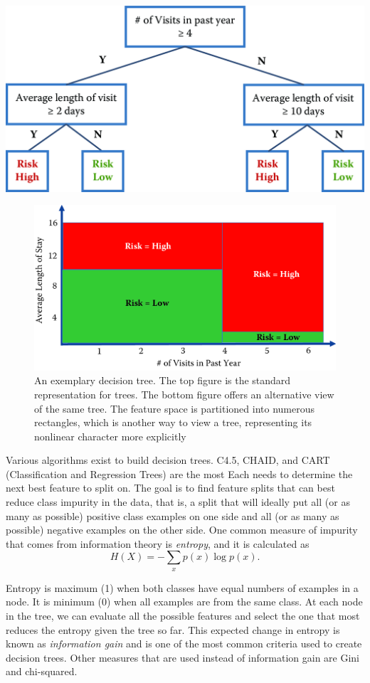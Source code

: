 \documentclass[]{krantz}
\begin{document}
\begin{center}\includegraphics[width=0.7\linewidth]{ChapterML/figures/tree} \end{center}\begin{figure}

{\centering \includegraphics[width=0.7\linewidth]{ChapterML/figures/tree-rectangle} 

}

\caption{An exemplary decision tree. The top figure is the standard representation for trees. The bottom figure offers an alternative view of the same tree. The feature space is partitioned into numerous rectangles, which is another way to view a tree, representing its nonlinear character more explicitly}\label{fig:tree}
\end{figure}

Various algorithms exist to build decision trees. C4.5, CHAID, and CART
(Classification and Regression Trees) are the most Each needs to
determine the next best feature to split on. The goal is to find feature
splits that can best reduce class impurity in the data, that is, a split
that will ideally put all (or as many as possible) positive class
examples on one side and all (or as many as possible) negative examples
on the other side. One common measure of impurity that comes from
information theory is \emph{entropy}, and it is calculated as
\[H(X) = -\sum_x p(x) \log p(x).\]

Entropy is maximum (1) when both classes have equal numbers of examples
in a node. It is minimum (0) when all examples are from the same class.
At each node in the tree, we can evaluate all the possible features and
select the one that most reduces the entropy given the tree so far. This
expected change in entropy is known as \emph{information gain} and is
one of the most common criteria used to create decision trees. Other
measures that are used instead of information gain are Gini and
chi-squared.
\end{document}
